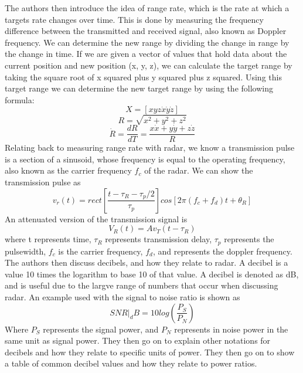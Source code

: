 \documentclass[12pt]{article}
\begin{document}
The authors then introduce the idea of range rate, which is the rate at which a targets rate changes over time. This is done by measuring the frequency difference between the transmitted and received signal, also known as Doppler frequency. We can determine the new range by dividing the change in range by the change in time. If we are given a vector of values that hold data about the current position and new position (x, y, z), we can calculate the target range by taking the square root of x squared plus y squared plus z squared. Using this target range we can determine the new target range by using the following formula:
\begin{equation}
    X = [x y z \dot{x} \dot{y} \dot{z}]
\end{equation}
\begin{equation}
    R = \sqrt{x^2 + y^2 + z^2}
\end{equation}
\begin{equation}
    \dot{R} = \frac{dR}{dT} = \frac{x\dot{x}+y\dot{y}+z\dot{z}}{R}
\end{equation}
Relating back to measuring range rate with radar, we know a transmission pulse is a section of a sinusoid, whose frequency is equal to the operating frequency, also known as the carrier frequency $f_c$ of the radar. We can show the transmission pulse as
\begin{equation}
    v_r (t) = rect \left[ \frac{t - \tau_R - \tau_p / 2}{\tau_p} \right] cos \left[  2 \pi (f_c + f_d)t + \theta_R \right]
\end{equation}
An attenuated version of the transmission signal is
\begin{equation}
    V_R(t) = Av_T(t- \tau_R)
\end{equation}
where t represents time, $\tau_R$ represents transmission delay, $\tau_p$ represents the pulsewidth, $f_c$ is the carrier frequency, $f_d$, and represents the doppler frequency.
The authors then discuss decibels, and how they relate to radar. A decibel is a value 10 times the logarithm to base 10 of that value. A decibel is denoted as dB, and is useful due to the largve range of numbers that occur when discussing radar. An example used with the signal to noise ratio is shown as
\begin{equation}
    SNR|_dB = 10log \left( \frac{P_S}{P_N} \right)
\end{equation}
Where $P_S$ represents the signal power, and $P_N$ represents in noise power in the same unit as signal power. They then go on to explain other notations for decibels and how they relate to specific units of power. They then go on to show a table of common decibel values and how they relate to power ratios.
\end{document}
